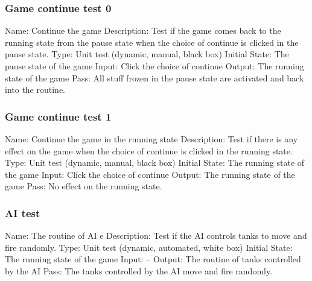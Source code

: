 \documentclass{article}
\begin{document}
\subsubsection{Game continue test 0}
Name:  Continue the game\newline
Description: Test if the game comes back to the running state from the pause 
state when the choice of continue is clicked in the pause state. \newline
Type: Unit test (dynamic, manual, black box) \newline
Initial State: The pause state of the game\newline
Input: Click the choice of continue \newline
Output: The running state of the game\newline
Pass: All stuff frozen in the pause state are activated and back into the 
routine. \newline

\subsubsection{Game continue test 1}
Name:  Continue the game in the running state\newline
Description: Test if there is any effect on the game when the choice of 
continue is clicked in the running state. \newline
Type: Unit test (dynamic, manual, black box) \newline
Initial State: The running state of the game \newline
Input: Click the choice of continue \newline
Output: The running state of the game \newline
Pass: No effect on the running state. \newline

\subsubsection{AI test}
Name:  The routine of AI e\newline
Description: Test if the AI controls tanks to move and fire randomly. \newline
Type: Unit test (dynamic, automated, white box) \newline
Initial State: The running state of the game \newline
Input: -- \newline
Output: The routine of tanks controlled by the AI \newline
Pass: The tanks controlled by the AI move and fire randomly. \newline
\end{document}
